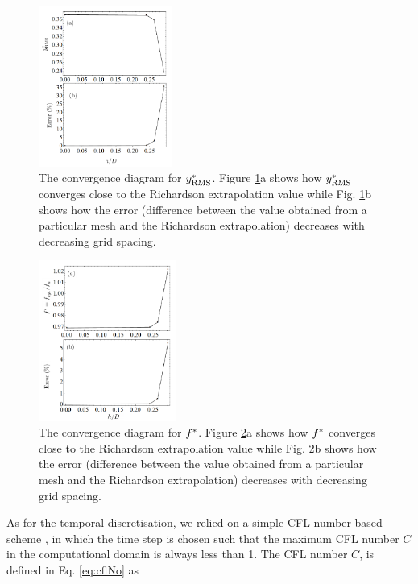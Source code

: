 \documentclass[a4paper,fleqn]{cas-sc}
\begin{document}
\begin{figure}
  \centering
  \includegraphics[width=0.39\textwidth]{figs/figure7}
  \caption{The convergence diagram for $y^{*}_{\text{RMS}}$. Figure \ref{fig:yrmsGCI}a shows how $y^{*}_{\text{RMS}}$ converges close to the Richardson extrapolation value while Fig. \ref{fig:yrmsGCI}b shows how the error (difference between the value obtained from a particular mesh and the Richardson extrapolation) decreases with decreasing grid spacing.} \label{fig:yrmsGCI}
\end{figure}

\begin{figure}
  \centering
  \includegraphics[width=0.4\textwidth]{figs/figure8}
  \caption{The convergence diagram for $f^{*}$. Figure \ref{fig:fstrGCI}a shows how $f^{*}$ converges close to the Richardson extrapolation value while Fig. \ref{fig:fstrGCI}b shows how the error (difference between the value obtained from a particular mesh and the Richardson extrapolation) decreases with decreasing grid spacing.} \label{fig:fstrGCI}
\end{figure}

\color{blue}
As for the temporal discretisation, we relied on a simple CFL number-based scheme \citep{Hemsuwan2018a,Hemsuwan2018b,Hemsuwan2018c}, in which the time step is chosen such that the maximum CFL number $C$ in the computational domain is always less than 1. The CFL number $C$, is defined in Eq. \ref{eq:cflNo} as
\end{document}

